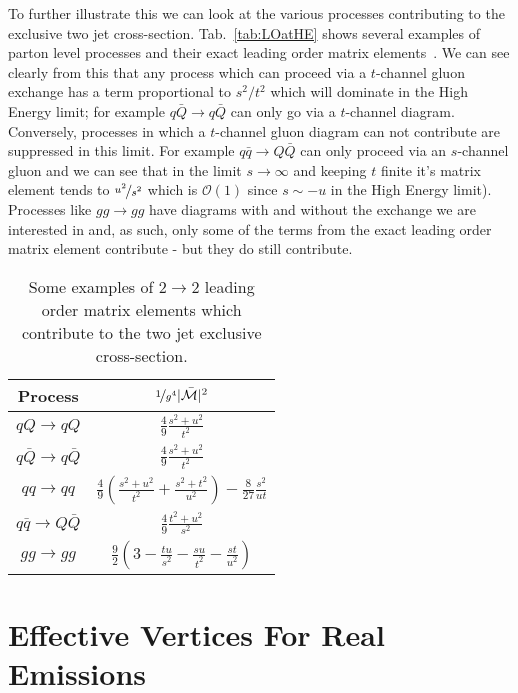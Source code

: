 	To further illustrate this we can look at the various processes contributing to the exclusive two
	jet cross-section.  Tab.~\eqref{tab:LOatHE} shows several examples of parton level
	processes and their exact leading order matrix elements~\cite{pinkBook}.  We can see clearly
	from this that any process which can proceed via a $t$-channel gluon exchange has a term
	proportional to $s^2/t^2$ which will dominate in the High Energy limit; for
	example $q\bar{Q}\to q\bar{Q}$ can only go via a $t$-channel diagram.
	Conversely, processes in which a $t$-channel gluon diagram can not contribute are
	suppressed in this limit.  For example $q\bar{q}\to Q\bar{Q}$ can only proceed via an
	$s$-channel gluon and we can see that in the limit $s\to\infty$ and keeping $t$ finite it's matrix
	element tends to $\nicefrac{u^2}{s^2}$ which is $\mathcal{O}(1)$ since $s\sim-u$ in the High Energy limit).
	Processes like $gg\to gg$ have diagrams with and without the exchange we are interested in
	and, as such, only some of the terms from the exact leading order matrix element
	contribute - but they do still contribute.

	\begin{table}[hbt!]
		\begin{center}
		\begin{tabular}{c | c }
		Process                 & $\nicefrac{1}{g^4}|\bar{\mathcal{M}}|^2$ \\ \hline
		$qQ\to qQ$              & $\frac{4}{9}\frac{s^2 + u^2}{t^2}$       \\
		$q\bar{Q}\to q\bar{Q}$  & $\frac{4}{9}\frac{s^2 + u^2}{t^2}$       \\
		$qq\to qq$              & $\frac{4}{9}\left(\frac{s^2 + u^2}{t^2} + \frac{s^2 + t^2}{u^2}\right) - \frac{8}{27}\frac{s^2}{ut}$\\
		$q\bar{q}\to Q\bar{Q}$  & $\frac{4}{9}\frac{t^2 + u^2}{s^2}$       \\
		$gg\to gg$              & $\frac{9}{2}\left(3-\frac{tu}{s^2}-\frac{su}{t^2}-\frac{st}{u^2}\right)$\\
		\end{tabular}
		\caption{Some examples of $2\to2$ leading order matrix elements which contribute to the
		two jet exclusive cross-section.}
		\label{tab:LOatHE}
		\end{center}
	\end{table}

\section{Effective Vertices For Real Emissions}
	\label{sec:effectiveVertices}

